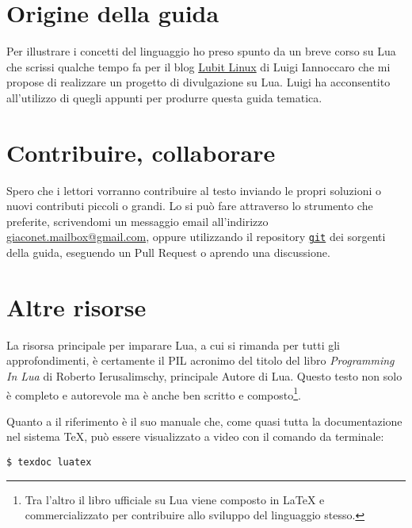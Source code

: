 \section{Origine della guida}

Per illustrare i concetti del linguaggio ho preso spunto da un breve corso su
Lua che scrissi qualche tempo fa per il blog
\href{http://parliamodi-ubuntu.blogspot.it}{Lubit Linux} di Luigi Iannoccaro
che mi propose di realizzare un progetto di divulgazione su Lua. Luigi ha
acconsentito all'utilizzo di quegli appunti per produrre questa guida tematica.


\section{Contribuire, collaborare}

Spero che i lettori vorranno contribuire al testo inviando le propri soluzioni o
nuovi contributi piccoli o grandi. Lo si può fare attraverso lo strumento che
preferite, scrivendomi un messaggio email all'indirizzo
\href{mailto:giaconet.mailbox@gmail.com}{giaconet.mailbox@gmail.com}, oppure
utilizzando il repository
\href{https://github.com/GuITeX/guidalua}{\texttt{git}} dei sorgenti della
guida, eseguendo un Pull Request o aprendo una discussione.


\section{Altre risorse}

La risorsa principale per imparare Lua, a cui si rimanda per tutti gli
approfondimenti, è certamente il PIL acronimo del titolo del libro
\emph{Programming In Lua} di Roberto Ierusalimschy, principale Autore
di Lua. Questo testo non solo è completo e autorevole ma è anche ben scritto e
composto\footnote{Tra l'altro il libro ufficiale su Lua viene composto in
\LaTeX{} e commercializzato per contribuire allo sviluppo del linguaggio
stesso.}.

Quanto a \LuaTeX{} il riferimento è il suo manuale che, come quasi tutta la
documentazione nel sistema \TeX{}, può essere visualizzato a video con il
comando da terminale:
\begin{Verbatim}
$ texdoc luatex
\end{Verbatim}

